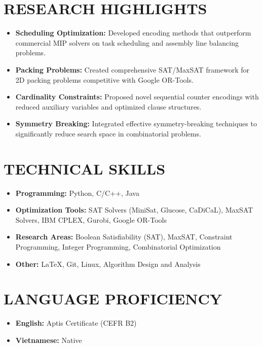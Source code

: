 \documentclass[a4paper,10pt]{extarticle}
\begin{document}
\section*{RESEARCH HIGHLIGHTS}
\begin{itemize}
    \item \textbf{Scheduling Optimization:} Developed encoding methods that outperform commercial MIP solvers on task scheduling and assembly line balancing problems.
    \item \textbf{Packing Problems:} Created comprehensive SAT/MaxSAT framework for 2D packing problems competitive with Google OR-Tools.
    \item \textbf{Cardinality Constraints:} Proposed novel sequential counter encodings with reduced auxiliary variables and optimized clause structures.
    \item \textbf{Symmetry Breaking:} Integrated effective symmetry-breaking techniques to significantly reduce search space in combinatorial problems.
\end{itemize}

\section*{TECHNICAL SKILLS}
\begin{itemize}
    \item \textbf{Programming:} Python, C/C++, Java
    \item \textbf{Optimization Tools:} SAT Solvers (MiniSat, Glucose, CaDiCaL), MaxSAT Solvers, IBM CPLEX, Gurobi, Google OR-Tools
    \item \textbf{Research Areas:} Boolean Satisfiability (SAT), MaxSAT, Constraint Programming, Integer Programming, Combinatorial Optimization
    \item \textbf{Other:} \LaTeX, Git, Linux, Algorithm Design and Analysis
\end{itemize}

\section*{LANGUAGE PROFICIENCY}
\begin{itemize}
    \item \textbf{English:} Aptis Certificate (CEFR B2)
    \item \textbf{Vietnamese:} Native
\end{itemize}

\end{document}
